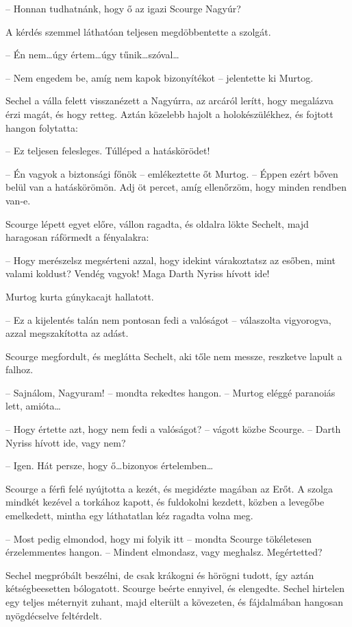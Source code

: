 \documentclass{thesis-ekf}
\theoremstyle{definition}
\begin{document}
-- Honnan tudhatnánk, hogy ő az igazi Scourge Nagyúr?

A kérdés szemmel láthatóan teljesen megdöbbentette a szolgát.

-- Én nem\dots úgy értem\dots úgy tűnik\dots szóval\dots

-- Nem engedem be, amíg nem kapok bizonyítékot -- jelentette ki Murtog.

Sechel a válla felett visszanézett a Nagyúrra, az arcáról lerítt, hogy megalázva érzi magát, és
hogy retteg. Aztán közelebb hajolt a holokészülékhez, és fojtott hangon folytatta:

-- Ez teljesen felesleges. Túlléped a hatáskörödet!

-- Én vagyok a biztonsági főnök -- emlékeztette őt Murtog. -- Éppen ezért bőven belül van a
hatáskörömön. Adj öt percet, amíg ellenőrzöm, hogy minden rendben van-e.

Scourge lépett egyet előre, vállon ragadta, és oldalra lökte Sechelt, majd haragosan
ráförmedt a fényalakra:

-- Hogy merészelsz megsérteni azzal, hogy idekint várakoztatsz az esőben, mint valami
koldust? Vendég vagyok! Maga Darth Nyriss hívott ide!

Murtog kurta gúnykacajt hallatott.

-- Ez a kijelentés talán nem pontosan fedi a valóságot -- válaszolta vigyorogva, azzal
megszakította az adást.

Scourge megfordult, és meglátta Sechelt, aki tőle nem messze, reszketve lapult a falhoz.

-- Sajnálom, Nagyuram! -- mondta rekedtes hangon. -- Murtog eléggé paranoiás lett,
amióta\dots

-- Hogy értette azt, hogy nem fedi a valóságot? -- vágott közbe Scourge. -- Darth Nyriss
hívott ide, vagy nem?

-- Igen. Hát persze, hogy ő\dots bizonyos értelemben\dots

Scourge a férfi felé nyújtotta a kezét, és megidézte magában az
Erőt. A szolga mindkét kezével a torkához kapott, és fuldokolni kezdett, közben a levegőbe
emelkedett, mintha egy láthatatlan kéz ragadta volna meg.

-- Most pedig elmondod, hogy mi folyik itt -- mondta Scourge tökéletesen érzelemmentes
hangon. -- Mindent elmondasz, vagy meghalsz. Megértetted?

Sechel megpróbált beszélni, de csak krákogni és hörögni tudott, így aztán kétségbeesetten
bólogatott. Scourge beérte ennyivel, és elengedte. Sechel hirtelen egy teljes méternyit zuhant,
majd elterült a kövezeten, és fájdalmában hangosan nyögdécselve feltérdelt.
\end{document}
